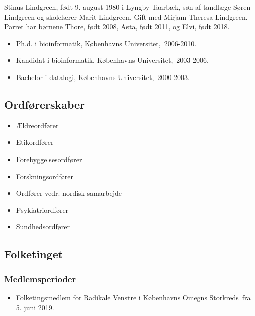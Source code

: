 \documentclass[11pt, a4paper]{awesome-cv}
\begin{document}
\makecvheader[R]
\makelettertitle
\begin{cvletter}
Stinus Lindgreen, født 9. august 1980 i Lyngby-Taarbæk, søn af tandlæge Søren Lindgreen og skolelærer Marit Lindgreen. Gift med Mirjam Theresa Lindgreen. Parret har børnene Thore, født 2008, Asta, født 2011, og Elvi, født 2018.

\begin{itemize}
\item Ph.d. i bioinformatik, Københavns Universitet, 2006-2010.
\item Kandidat i bioinformatik, Københavns Universitet, 2003-2006.
\item Bachelor i datalogi, Københavns Universitet, 2000-2003.
\end{itemize}
\subsection*{Ordførerskaber}
\begin{itemize}
\item Ældreordfører
\item Etikordfører
\item Forebyggelsesordfører
\item Forskningsordfører
\item Ordfører vedr. nordisk samarbejde
\item Psykiatriordfører
\item Sundhedsordfører
\end{itemize}
\subsection*{Folketinget}
\subsubsection*{Medlemsperioder}
\begin{itemize}
\item Folketingsmedlem for Radikale Venstre i Københavns Omegns Storkreds fra 5. juni 2019.
\end{itemize}

\end{cvletter}
\end{document}

